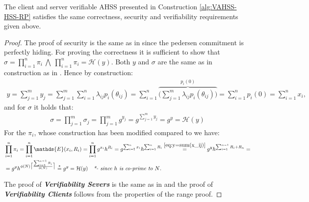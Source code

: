 \begin{thm}
\vspace{10pt}
The client and server verifiable AHSS presented in Construction \ref{alg:VAHSS-HSS-RP} satisfies the same correctness, security and verifiability requirements given above.
\end{thm}
\begin{proof}
The proof of security is the same as in \cite{SumItUp} since the pedersen commitment is perfectly hiding. For proving the correctness it is sufficient to show that $\sigma= \prod_{i=1}^n \pi_i \:\bigwedge\: \prod_{i=1}^n \pi_i = \mathcal{H}(y)$. Both $y$ and $\sigma$ are the same as in construction as in \cite{VAHSS}. Hence by construction:
\begin{align}
    \label{eq:y=sum(x_ij)}
    y = \sum_{j=1}^m y_j= \sum_{j=1}^m \sum_{i=1}^n \lambda_{ij}p_i(\theta_{ij}) = \sum_{i=1}^n \overbrace{ \Big (\sum_{j=1}^m \lambda_{ij}p_i(\theta_{ij}) \Big)}^{ p_i(0)} = \sum_{i=1}^n p_i(0) = \sum_{i=1}^n x_i,
\end{align}
and for $\sigma$ it holds that:
\begin{align*}
    \sigma = \prod_{j=1}^m \sigma_j = \prod_{j=1}^m g^{y_j} = g^{\sum_{j=1}^my_j} =g^y = \mathcal{H}(y)
\end{align*}
For the $\pi_i$, whose construction has been modified compared to \cite{VAHSS} we have:
\begin{align*}
    &\prod_{i=1}^n \pi_i = \prod_{i=1}^n \mathds{E}(x_i,R_i)= \prod_{i=1}^n g^{x_i}h^{R_i} = g^{\sum_{i=1}^n x_i } h^{\sum_{i=1}^n R_i} \overset{\eqref{eq:y=sum(x_ij)}}{=} g^y h^{\sum_{i=1}^{n-1} R_i+R_n} = \\ 
    &= g^y h^{ \phi(N)\big\lceil \frac{\sum_{i=1}^{n-1}R_i}{\phi(N) }\big\rceil}  \overset{*}{=} g^y = \mathcal{H}(y) \quad \textit{*- since $h$ is co-prime to $N$.}
\end{align*}

The proof of \textit{\textbf{Verifiability Severs}} is the same as in \cite{SumItUp} and the proof of \textit{\textbf{Verifiability Clients}} follows from the properties of  the range proof.
\end{proof}


